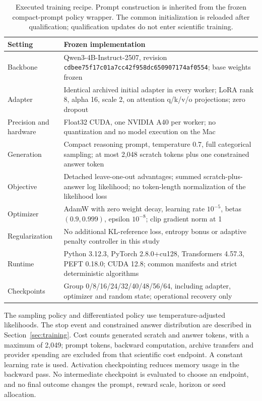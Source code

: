 \documentclass[11pt]{article}
\begin{document}
\begin{table}[htbp]
\centering\small
\begin{tabularx}{\linewidth}{@{}lX@{}}
\toprule
Setting & Frozen implementation \\
\midrule
Backbone & Qwen3-4B-Instruct-2507, revision \nolinkurl{cdbee75f17c01a7cc42f958dc650907174af0554}; base weights frozen \\
Adapter & Identical archived initial adapter in every worker; LoRA rank 8, alpha 16, scale 2, on attention q/k/v/o projections; zero dropout \\
Precision and hardware & Float32 CUDA, one NVIDIA A40 per worker; no quantization and no model execution on the Mac \\
Generation & Compact reasoning prompt, temperature 0.7, full categorical sampling; at most 2,048 scratch tokens plus one constrained answer token \\
Objective & Detached leave-one-out advantages; summed scratch-plus-answer log likelihood; no token-length normalization of the likelihood loss \\
Optimizer & AdamW with zero weight decay, learning rate $10^{-5}$, betas $(0.9,0.999)$, epsilon $10^{-8}$; clip gradient norm at 1 \\
Regularization & No additional KL-reference loss, entropy bonus or adaptive penalty controller in this study \\
Runtime & Python 3.12.3, PyTorch 2.8.0+cu128, Transformers 4.57.3, PEFT 0.18.0; CUDA 12.8; common manifests and strict deterministic algorithms \\
Checkpoints & Group 0/8/16/24/32/40/48/56/64, including adapter, optimizer and random state; operational recovery only \\
\bottomrule
\end{tabularx}
\caption{Executed training recipe. Prompt construction is inherited from the frozen compact-prompt policy wrapper. The common initialization is reloaded after qualification; qualification updates do not enter scientific training.}
\label{tab:mechanism-recipe}
\end{table}

The sampling policy and differentiated policy use temperature-adjusted likelihoods. The stop event and constrained answer distribution are described in Section~\ref{sec:training}. Cost counts generated scratch and answer tokens, with a maximum of 2,049; prompt tokens, backward computation, archive transfers and provider spending are excluded from that scientific cost endpoint. A constant learning rate is used. Activation checkpointing reduces memory usage in the backward pass. No intermediate checkpoint is evaluated to choose an endpoint, and no final outcome changes the prompt, reward scale, horizon or seed allocation.
\end{document}

